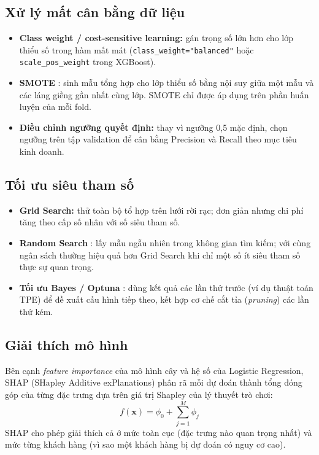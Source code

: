 \subsection{Xử lý mất cân bằng dữ liệu}
\begin{itemize}
    \item \textbf{Class weight / cost-sensitive learning:} gán trọng số lớn hơn cho lớp thiểu số trong hàm mất mát (\texttt{class\_weight="balanced"} hoặc \texttt{scale\_pos\_weight} trong XGBoost).
    \item \textbf{SMOTE} \cite{chawla2002}: sinh mẫu tổng hợp cho lớp thiểu số bằng nội suy giữa một mẫu và các láng giềng gần nhất cùng lớp. SMOTE chỉ được áp dụng trên phần huấn luyện của mỗi fold.
    \item \textbf{Điều chỉnh ngưỡng quyết định:} thay vì ngưỡng 0{,}5 mặc định, chọn ngưỡng trên tập validation để cân bằng Precision và Recall theo mục tiêu kinh doanh.
\end{itemize}

\subsection{Tối ưu siêu tham số}
\begin{itemize}
    \item \textbf{Grid Search:} thử toàn bộ tổ hợp trên lưới rời rạc; đơn giản nhưng chi phí tăng theo cấp số nhân với số siêu tham số.
    \item \textbf{Random Search} \cite{bergstra2012}: lấy mẫu ngẫu nhiên trong không gian tìm kiếm; với cùng ngân sách thường hiệu quả hơn Grid Search khi chỉ một số ít siêu tham số thực sự quan trọng.
    \item \textbf{Tối ưu Bayes / Optuna} \cite{akiba2019}: dùng kết quả các lần thử trước (ví dụ thuật toán TPE) để đề xuất cấu hình tiếp theo, kết hợp cơ chế cắt tỉa (\textit{pruning}) các lần thử kém.
\end{itemize}

\subsection{Giải thích mô hình}
Bên cạnh \textit{feature importance} của mô hình cây và hệ số của Logistic Regression, SHAP (SHapley Additive exPlanations) \cite{lundberg2017} phân rã mỗi dự đoán thành tổng đóng góp của từng đặc trưng dựa trên giá trị Shapley của lý thuyết trò chơi:
\begin{equation}
    f(\mathbf{x}) = \phi_0 + \sum_{j=1}^{M} \phi_j
\end{equation}
SHAP cho phép giải thích cả ở mức toàn cục (đặc trưng nào quan trọng nhất) và mức từng khách hàng (vì sao một khách hàng bị dự đoán có nguy cơ cao).

